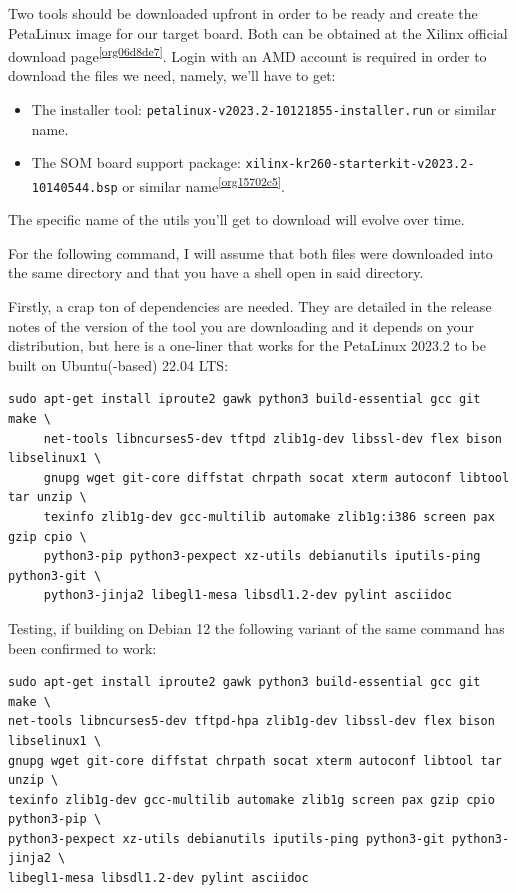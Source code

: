 \documentclass[10pt]{article}
\begin{document}
Two tools should be downloaded upfront in order to be ready and create the
PetaLinux image for our target board. Both can be obtained at the Xilinx
official download page\textsuperscript{\ref{org06d8de7}}. Login with an AMD account is required in order to
download the files we need, namely, we'll have to get:
\begin{itemize}
\item The installer tool: \texttt{petalinux-v2023.2-10121855-installer.run} or similar name.
\item The SOM board support package: \texttt{xilinx-kr260-starterkit-v2023.2-10140544.bsp} or similar name\textsuperscript{\ref{org15702c5}}.
\end{itemize}
The specific name of the utils you'll get to download will evolve over time.

For the following command, I will assume that both files were downloaded into
the same directory and that you have a shell open in said directory.

Firstly, a crap ton of dependencies are needed. They are detailed in the
release notes of the version of the tool you are downloading and it depends on
your distribution, but here is a one-liner that works for the PetaLinux 2023.2
to be built on Ubuntu(-based) 22.04 LTS:
\begin{verbatim}
sudo apt-get install iproute2 gawk python3 build-essential gcc git make \
     net-tools libncurses5-dev tftpd zlib1g-dev libssl-dev flex bison libselinux1 \
     gnupg wget git-core diffstat chrpath socat xterm autoconf libtool tar unzip \
     texinfo zlib1g-dev gcc-multilib automake zlib1g:i386 screen pax gzip cpio \
     python3-pip python3-pexpect xz-utils debianutils iputils-ping python3-git \
     python3-jinja2 libegl1-mesa libsdl1.2-dev pylint asciidoc
\end{verbatim}

Testing, if building on Debian 12 the following variant of the same command has been confirmed to work:
\begin{verbatim}
sudo apt-get install iproute2 gawk python3 build-essential gcc git make \
net-tools libncurses5-dev tftpd-hpa zlib1g-dev libssl-dev flex bison libselinux1 \
gnupg wget git-core diffstat chrpath socat xterm autoconf libtool tar unzip \
texinfo zlib1g-dev gcc-multilib automake zlib1g screen pax gzip cpio python3-pip \
python3-pexpect xz-utils debianutils iputils-ping python3-git python3-jinja2 \
libegl1-mesa libsdl1.2-dev pylint asciidoc
\end{verbatim}
\end{document}
